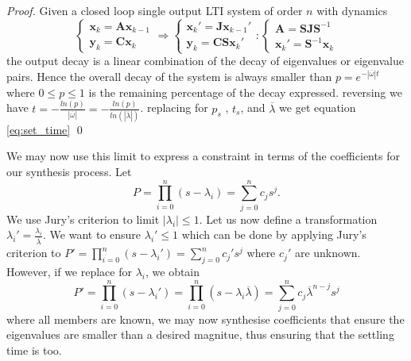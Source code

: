 \documentclass[twocolumn]{autart}    %
\newcommand{\mat}[1]{\boldsymbol{#1}}
\renewcommand{\vec}[1]{\boldsymbol{#1}}
\newtheorem{proof}{Proof}
\begin{document}
\begin{proof}
Given a closed loop single output LTI system of order $n$ with dynamics
\begin{equation}
\left\{\begin{array}{c}\vec{x}_k=\mat{A}\vec{x}_{k-1}\\ \vec{y}_k=\mat{C}\vec{x}_k\end{array}\right. \Rightarrow \left\{ \begin{array}{c}\vec{x}_k'=\mat{J}\vec{x}_{k-1}'\\ \vec{y}_k=\mat{C}\mat{S}\vec{x}_k'\end{array}\right. : \left\{ \begin{array}{c}\mat{A}=\mat{S}\mat{J}\mat{S}^{-1} \\ \vec{x}_k'=\mat{S}^{-1}\vec{x}_k\end{array}\right.
\end{equation}
%
the output decay is a linear combination of the decay of eigenvalues or
eigenvalue pairs.  Hence the overall decay of the system is always smaller
than $p=e^{-|\overline{\omega}| t}$ where $0\leq p\leq 1$ is the remaining
percentage of the decay expressed.  reversing we have
$t=-\frac{ln(p)}{|\overline{\omega}|}=-\frac{ln(p)}{ln(|\overline{\lambda}|)}$. 
replacing for $p_s$ , $t_s$, and $\overline{\lambda}$ we get equation
\eqref{eq:set_time}
%
\qed
\end{proof}
%
We may now use this limit to express a constraint in terms of the
coefficients for our synthesis process.  Let
%
\begin{equation}
P=\prod_{i=0}^n (s-\lambda_i)=\sum_{j=0}^n c_js^j.
\end{equation}
%
We use Jury's criterion to limit $|\lambda_i| \leq 1$.  Let us now define a
transformation $\lambda_i'=\frac{\lambda_i}{\overline{\lambda}}$.  We want
to ensure $\lambda_i' \leq 1$ which can be done by applying Jury's criterion
to $P'=\prod_{i=0}^n (s-\lambda_i')=\sum_{j=0}^n c_j's^j$ where $c_j'$ are
unknown.  However, if we replace for $\lambda_i$, we obtain
%
\begin{equation}
P'=\prod_{i=0}^n (s-\lambda_i')=\prod_{i=0}^n (s-\lambda_i\overline{\lambda})=\sum_{j=0}^n c_j\overline{\lambda}^{n-j}s^j
\end{equation}
%
where all members are known, we may now synthesise coefficients that ensure
the eigenvalues are smaller than a desired magnitue, thus ensuring that the
settling time is too.

\end{document}
